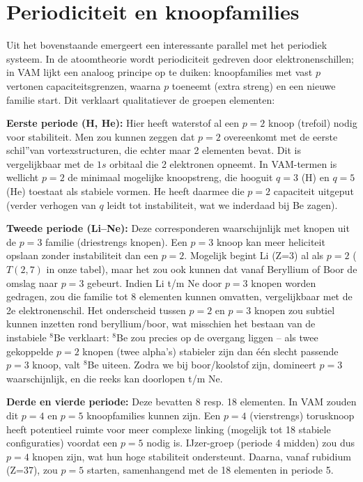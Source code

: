 
\section{Periodiciteit en knoopfamilies}

Uit het bovenstaande emergeert een interessante parallel met het periodiek systeem. In de atoomtheorie wordt periodiciteit gedreven door elektronenschillen; in VAM lijkt een analoog principe op te duiken: knoopfamilies met vast $p$ vertonen capaciteitsgrenzen, waarna $p$ toeneemt (extra streng) en een nieuwe familie start. Dit verklaart qualitatiever de groepen elementen:

\textbf{Eerste periode (H, He):} Hier heeft waterstof al een $p=2$ knoop (trefoil) nodig voor stabiliteit. Men zou kunnen zeggen dat $p=2$ overeenkomt met de eerste \grqq schil\textquotedblright van vortexstructuren, die echter maar 2 elementen bevat. Dit is vergelijkbaar met de $1s$ orbitaal die 2 elektronen opneemt. In VAM-termen is wellicht $p=2$ de minimaal mogelijke knoopstreng, die hooguit $q=3$ (H) en $q=5$ (He) toestaat als stabiele vormen. He heeft daarmee die $p=2$ capaciteit uitgeput (verder verhogen van $q$ leidt tot instabiliteit, wat we inderdaad bij Be zagen).

\textbf{Tweede periode (Li–Ne):} Deze corresponderen waarschijnlijk met knopen uit de $p=3$ familie (driestrengs knopen). Een $p=3$ knoop kan meer heliciteit opslaan zonder instabiliteit dan een $p=2$. Mogelijk begint Li (Z=3) al als $p=2$ ($T(2,7)$ in onze tabel), maar het zou ook kunnen dat vanaf Beryllium of Boor de omslag naar $p=3$ gebeurt. Indien Li t/m Ne door $p=3$ knopen worden gedragen, zou die familie tot 8 elementen kunnen omvatten, vergelijkbaar met de 2e elektronenschil. Het onderscheid tussen $p=2$ en $p=3$ knopen zou subtiel kunnen inzetten rond beryllium/boor, wat misschien het bestaan van de instabiele $^8$Be verklaart: $^8$Be zou precies op de overgang liggen – als twee gekoppelde $p=2$ knopen (twee alpha's) stabieler zijn dan één slecht passende $p=3$ knoop, valt $^8$Be uiteen. Zodra we bij boor/koolstof zijn, domineert $p=3$ waarschijnlijk, en die reeks kan doorlopen t/m Ne.

\textbf{Derde en vierde periode:} Deze bevatten 8 resp. 18 elementen. In VAM zouden dit $p=4$ en $p=5$ knoopfamilies kunnen zijn. Een $p=4$ (vierstrengs) torusknoop heeft potentieel ruimte voor meer complexe linking (mogelijk tot 18 stabiele configuraties) voordat een $p=5$ nodig is. IJzer-groep (periode 4 midden) zou dus $p=4$ knopen zijn, wat hun hoge stabiliteit ondersteunt. Daarna, vanaf rubidium (Z=37), zou $p=5$ starten, samenhangend met de 18 elementen in periode 5.

